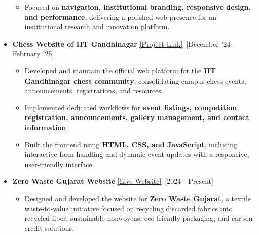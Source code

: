 \documentclass[a4paper,10pt]{article}
\newcommand{\isep}{-2 pt}
\begin{document}
\begin{itemize}
\begin{itemize}
        \item Focused on \textbf{navigation, institutional branding, responsive design,
        and performance}, delivering a polished web presence for an institutional
        research and innovation platform.

    \end{itemize}



    \item \textbf{Chess Website of IIT Gandhinagar} \underline{\href{https://github.com/devvrat-hans/Chess-IITGN}{[Project Link]}}\ \hfill [December '24 - February '25]\\[-0.7cm]

    \begin{itemize}\itemsep \isep

        \item Developed and maintain the official web platform for the
        \textbf{IIT Gandhinagar chess community}, consolidating campus chess events,
        announcements, registrations, and resources.

        \item Implemented dedicated workflows for \textbf{event listings,
        competition registration, announcements, gallery management,
        and contact information}.

        \item Built the frontend using \textbf{HTML, CSS, and JavaScript},
        including interactive form handling and dynamic event updates with a
        responsive, user-friendly interface.

    \end{itemize}



    \item \textbf{Zero Waste Gujarat Website} \underline{\href{https://zerowastegujarat.com}{[Live Website]}}\ \hfill [2024 - Present]\\[-0.7cm]

    \begin{itemize}\itemsep \isep

        \item Designed and developed the website for \textbf{Zero Waste Gujarat},
        a textile waste-to-value initiative focused on recycling discarded fabrics
        into recycled fiber, sustainable nonwovens, eco-friendly packaging,
        and carbon-credit solutions.


\end{itemize}
\end{itemize}
\end{document}

